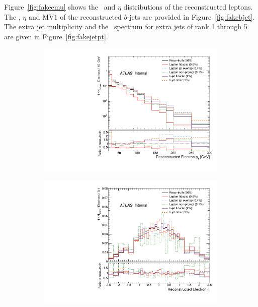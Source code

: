 Figure~\ref{fig:fakeemu}
shows the \pt\ and $\eta$ distributions of the reconstructed leptons.   The \pt, $\eta$ and MV1 of the reconstructed
$b$-jets are provided in Figure~\ref{fig:fakebjet}. The extra jet multiplicity and the \pt\ spectrum for extra
jets of rank 1 through 5 are given in Figure~\ref{fig:fakejetpt}.

\begin{figure}
\centering
\begin{subfigure}[]{0.45\textwidth}
\includegraphics[width=\textwidth]{fig/RecoNotTruth/ElecPt.pdf}
\end{subfigure}
\begin{subfigure}[]{0.45\textwidth}
\includegraphics[width=\textwidth]{fig/RecoNotTruth/ElecEta.pdf}
\end{subfigure}
\\

\end{figure}
